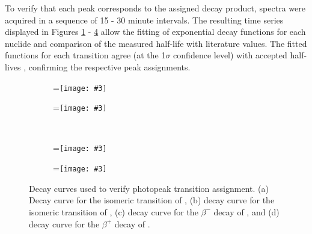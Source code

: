 \documentclass[5p]{elsarticle}
\newcommand{\comment}[1]{\todo[color=blue!20!white,inline]{ASV: #1}}
\newcommand{\subfigimg}[3][,]{%
  \setbox1=\hbox{\texttt{[image: \#3]}}%
  \leavevmode\rlap{\usebox1}%
  \rlap{\hspace*{50pt}\raisebox{\dimexpr\ht1-2\baselineskip}{#2}}%
  \phantom{\usebox1}%
}
\begin{document}
To verify that each peak corresponds to the assigned decay product, spectra were acquired in a sequence of 15 - 30 minute intervals.
The resulting time series displayed in Figures \ref{fig:decay_curve_336} - \ref{fig:decay_curve_511} allow the fitting of exponential decay functions for each nuclide and comparison of the measured half-life with literature values.
The fitted functions for each transition agree (at the 1$\sigma$ confidence level) with accepted half-lives \cite{Burrows2007,Singh2007,Blachot2010a,Blachot2012,Blachot2010}, confirming the respective peak assignments.


\begin{figure}
    \centering
    \begin{subfigure}[t]{0.49\textwidth}
        \centering
        \subfigimg[scale=0.6]{a)}{./figures/336keV_curve_new.pdf}
         \label{fig:decay_curve_336}
    \end{subfigure}%
     \begin{subfigure}[t]{0.49\textwidth}
        \centering
        \subfigimg[scale=0.6]{b)}{./figures/391keV_curve_new.pdf}
         \label{fig:decay_curve_391}
    \end{subfigure}%
    \\
    \begin{subfigure}[t]{0.49\textwidth}
        \centering
        \subfigimg[scale=0.6]{c)}{./figures/417keV_curve_new.pdf}
                 \label{fig:decay_curve_417}
    \end{subfigure}
     \begin{subfigure}[t]{0.49\textwidth}
        \centering
        \subfigimg[scale=0.6]{d)}{./figures/511keV_curve_new.pdf}
         \label{fig:decay_curve_511}
    \end{subfigure}%
    \caption{Decay curves used to verify photopeak transition assignment. (a) Decay curve for the isomeric transition of , (b) decay curve for the isomeric transition of , (c) decay curve for the $\beta^-$ decay of , and (d) decay curve for the $\beta^+$ decay of .}
     \label{fig:decay_curves}
\end{figure}
\end{document}
